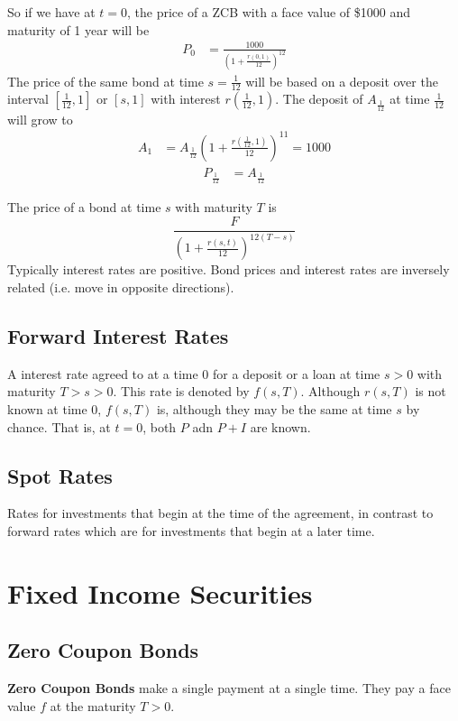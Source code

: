 \documentclass[12pt,letterpaper, twocolumn]{article}
\begin{document}
So if we have at $t=0$, the price of a ZCB with a face value of \$1000 and maturity of 1 year will be
\begin{align*}
    P_0 &= \frac{1000}{(1+\frac{r(0,1)}{12})^{12}}
\end{align*}
The price of the same bond at time $s=\frac{1}{12}$ will be based on a deposit over the interval $[\frac{1}{12},1]$ or $[s,1]$ with interest $r(\frac{1}{12},1)$. The deposit of $A_{\frac{1}{12}}$ at time $\frac{1}{12}$ will grow to 
\begin{align*}
    A_1 &= A_{\frac{1}{12}}\left(1+\frac{r(\frac{1}{12},1)}{12}\right)^{11} = 1000
\end{align*}
\begin{align*}
    P_{\frac{1}{12}} &= A_{\frac{1}{12}}
\end{align*}

The price of a bond at time $s$ with maturity $T$ is 
\[
    \frac{F}{\left( 1+ \frac{r(s,t)}{12} \right)^{12(T-s)}}
\]
Typically interest rates are positive. Bond prices and interest rates are inversely related (i.e. move in opposite directions).

\subsection{Forward Interest Rates}
A interest rate agreed to at a time 0 for a deposit or a loan at time $s>0$ with maturity $T>s>0$. This rate is denoted by $f(s, T)$. Although $r(s, T)$ is not known at time 0, $f(s, T)$ is, although they may be the same at time $s$ by chance.  That is, at $t=0$, both $P$ adn $P+I$ are known. 

\subsection{Spot Rates}
Rates for investments that begin at the time of the agreement, in contrast to forward rates which are for investments that begin at a later time. 

\section{Fixed Income Securities}
\subsection{Zero Coupon Bonds}
\textbf{Zero Coupon Bonds} make a single payment at a single time. They pay a face value $f$ at the maturity $T>0$. 
\end{document}
